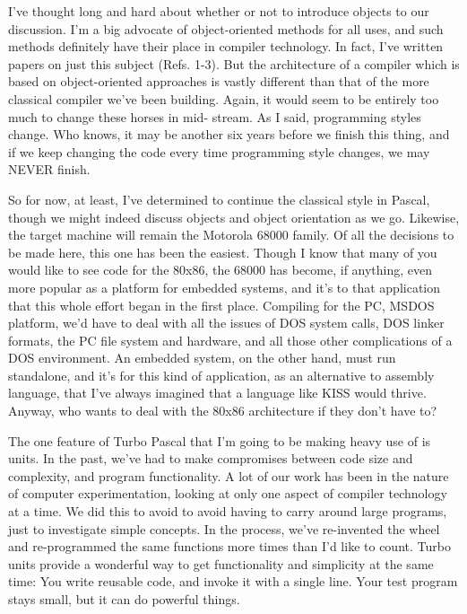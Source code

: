 I've thought long and hard about whether or not to introduce objects to our discussion. I'm a big advocate of object-oriented methods for all uses, and such methods definitely have their place in compiler technology. In fact, I've written papers on just this subject (Refs. 1-3). But the architecture of a compiler which is based on object-oriented approaches is vastly different than that of the more classical compiler we've been building. Again, it would seem to be entirely too much to change these horses in mid- stream. As I said, programming styles change. Who knows, it may be another six years before we finish this thing, and if we keep changing the code every time programming style changes, we may NEVER finish.

So for now, at least, I've determined to continue the classical style in Pascal, though we might indeed discuss objects and object orientation as we go. Likewise, the target machine will remain the Motorola 68000 family. Of all the decisions to be made here, this one has been the easiest. Though I know that many of you would like to see code for the 80x86, the 68000 has become, if anything, even more popular as a platform for embedded systems, and it's to that application that this whole effort began in the first place. Compiling for the PC, MSDOS platform, we'd have to deal with all the issues of DOS system calls, DOS linker formats, the PC file system and hardware, and all those other complications of a DOS environment. An embedded system, on the other hand, must run standalone, and it's for this kind of application, as an alternative to assembly language, that I've always imagined that a language like KISS would thrive. Anyway, who wants to deal with the 80x86 architecture if they don't have to?

The one feature of Turbo Pascal that I'm going to be making heavy use of is units. In the past, we've had to make compromises between code size and complexity, and program functionality. A lot of our work has been in the nature of computer experimentation, looking at only one aspect of compiler technology at a time. We did this to avoid to avoid having to carry around large programs, just to investigate simple concepts. In the process, we've re-invented the wheel and re-programmed the same functions more times than I'd like to count. Turbo units provide a wonderful way to get functionality and simplicity at the same time:  You write reusable code, and invoke it with a single line. Your test program stays small, but it can do powerful things.

